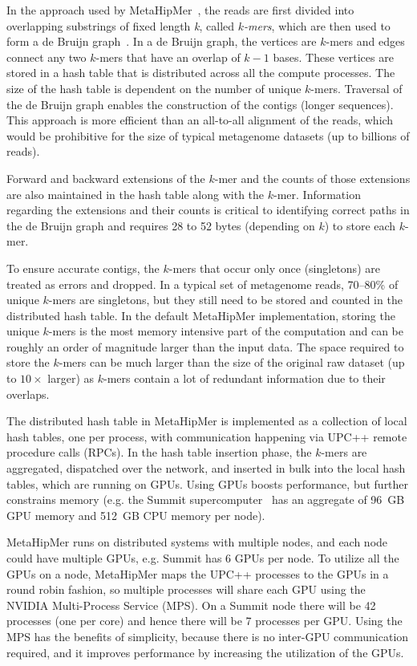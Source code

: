 In the approach used by MetaHipMer~\cite{GeorganasEHG18,HofmeyrEGC20}, the reads are first divided into overlapping substrings of fixed length {\it k}, called {\it $k$-mers}, which are then used to form a de Bruijn graph~\cite{CompeauPeTe11}. In a de Bruijn graph, the vertices are $k$-mers and edges connect any two $k$-mers that have an overlap of $k-1$ bases. These vertices are stored in a hash table that is distributed across all the compute processes.  The size of the hash table is dependent on the number of unique $k$-mers.  Traversal of the de Bruijn graph enables the construction of the contigs (longer sequences).  This approach is more efficient than an all-to-all alignment of the reads, which would be prohibitive for the size of typical metagenome datasets (up to billions of reads).

Forward and backward extensions of the $k$-mer and the counts of those extensions are also maintained in the hash table along with the $k$-mer. Information regarding the extensions and their counts is critical to identifying correct paths in the de Bruijn graph and requires 28 to 52 bytes (depending on $k$) to store each $k$-mer.

To ensure accurate contigs, the $k$-mers that occur only once (singletons) are
treated as errors and dropped. In a typical set of metagenome reads, 70--80\%
of unique $k$-mers are singletons, but they still need to be stored and counted
in the distributed hash table. In the default MetaHipMer implementation, storing the unique $k$-mers is the most memory intensive part of the computation and can be roughly an order of magnitude larger than the input data.  The space required to store the $k$-mers can be much larger than the size of the original raw dataset (up to $10\times$ larger) as $k$-mers contain a lot of redundant information due to their overlaps.



The distributed hash table in MetaHipMer is implemented as a collection of local hash tables, one per process, with communication happening via UPC++ remote procedure calls (RPCs). In the hash table insertion phase, the $k$-mers are aggregated, dispatched over the network, and inserted in bulk into the local hash tables, which are running on GPUs. Using GPUs boosts performance, but further constrains memory (e.g. the Summit supercomputer~\cite{VazhkudaiDBG18} has an aggregate of 96~GB GPU memory and 512~GB CPU memory per node).

MetaHipMer runs on distributed systems with multiple nodes, and each node could have multiple GPUs, e.g. Summit has 6 GPUs per node. To utilize all the GPUs on a node, MetaHipMer maps the UPC++ processes to the GPUs in a round robin fashion, so multiple processes will share each GPU using the NVIDIA Multi-Process Service (MPS)\@. On a Summit node there will be 42 processes (one per core) and hence there will be 7 processes per GPU\@. Using the MPS has the benefits of simplicity, because there is no inter-GPU communication required, and it improves performance by increasing the utilization of the GPUs.


